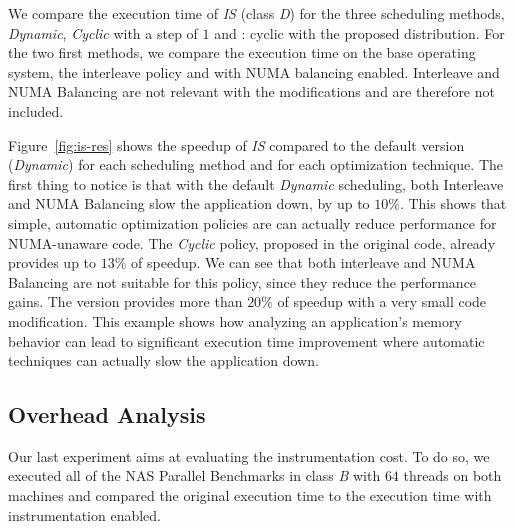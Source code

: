 We compare the execution time of \emph{IS} (class \emph{D}) for the three scheduling
methods, \emph{Dynamic}, \emph{Cyclic} with a step of $1$ and \TABARNAC:
cyclic with the proposed distribution. For the two first methods, we compare the
execution time on the base operating system, the interleave policy and with NUMA balancing enabled. Interleave and NUMA Balancing are not relevant with the
\TABARNAC modifications and are therefore not included.


Figure~\ref{fig:is-res} shows the speedup of \emph{IS} compared to
the default version (\emph{Dynamic}) for each scheduling method and for each
optimization technique. The first thing to notice is that with the default
\emph{Dynamic} scheduling, both Interleave and NUMA Balancing slow
the application down, by up to $10\%$. This shows that simple, automatic optimization policies are can actually reduce performance
for NUMA-unaware code.
The \emph{Cyclic} policy, proposed in the original code, already provides up to $13\%$ of
speedup. We can see that both interleave and NUMA Balancing are not suitable
for this policy, since they reduce the performance gains.
The \TABARNAC version provides more than $20\%$ of speedup with a very small code
modification.
This example shows how analyzing an application's memory behavior can lead to
significant execution time improvement where automatic techniques can actually slow
the application down.

\subsection{Overhead Analysis}
\label{sec:expe-overhead}

Our last experiment aims at evaluating the instrumentation cost. To do so, we
executed all of the NAS Parallel Benchmarks in class \emph{B} with $64$
threads on both machines and compared the original execution time to the execution time with instrumentation enabled.



